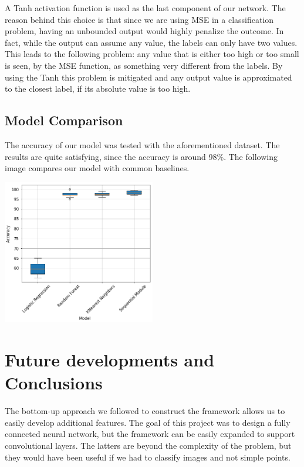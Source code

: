 \documentclass[10pt,conference,compsocconf]{IEEEtran}
\begin{document}
A Tanh activation function is used as the last component of our network. The reason behind this choice is that since we are using MSE in a classification problem, having an unbounded output would highly penalize the outcome. In fact, while the output can assume any value, the labels can only have two values. This leads to the following problem: any value that is either too high or too small is seen, by the MSE function, as something very different from the labels. 
By using the Tanh this problem is mitigated and any output value is approximated to the closest label, if its absolute value is too high.

\subsection{Model Comparison}
The accuracy of our model was tested with the aforementioned dataset. The results are quite satisfying, since the accuracy is around 98\%.
The following image compares our model with common baselines.

\begin{center}
	\captionsetup{type=figure}
	\includegraphics[width=0.5\textwidth]{img/boxplots_final.png}
	\label{fig:boxplot}
\end{center} 

\section{Future developments and Conclusions}
The bottom-up approach we followed to construct the framework allows us to easily develop additional features. The goal of this project was to design a fully connected neural network, but the framework can be easily expanded to support convolutional layers. The latters are beyond the complexity of the problem, but they would have been useful if we had to classify images and not simple points.
\end{document}
